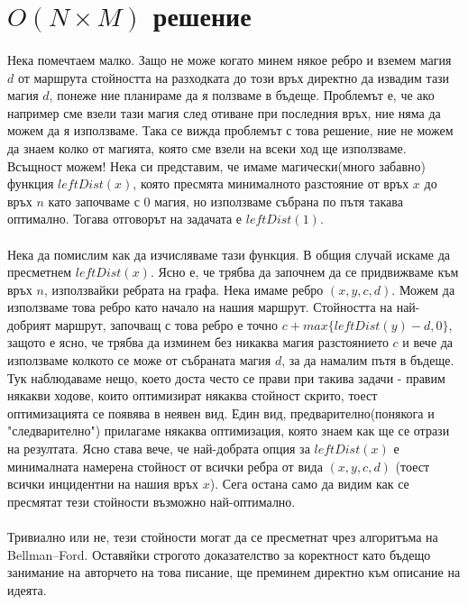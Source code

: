 \documentclass[12pt]{article}
\begin{document}
\section*{$O(N \times M)$ решение}
\paragraph*{}
Нека помечтаем малко. Защо не може когато минем някое ребро и вземем магия $d$ от маршрута стойността на разходката до този връх директно да извадим тази магия $d$, понеже ние планираме да я ползваме в бъдеще. Проблемът е, че ако например сме взели тази магия след отиване при последния връх, ние няма да можем да я използваме. Така се вижда проблемът с това решение, ние не можем да знаем колко от магията, която сме взели на всеки ход ще използваме. Всъщност можем! Нека си представим, че имаме магически(много забавно) функция $leftDist(x)$, която пресмята минималното разстояние от връх $x$ до връх $n$ като започваме с 0 магия, но използваме събрана по пътя такава оптимално. Тогава отговорът на задачата е $leftDist(1)$. 
\paragraph*{}
Нека да помислим как да изчисляваме тази функция. В общия случай искаме да пресметнем $leftDist(x)$. Ясно е, че трябва да започнем да се придвижваме към връх $n$, използвайки ребрата на графа. Нека имаме ребро $(x, y, c, d)$. Можем да използваме това ребро като начало на нашия маршрут. Стойността на най-добрият маршрут, започващ с това ребро е точно $c + max \{ leftDist(y)-d, 0 \}$, защото е ясно, че трябва да изминем без никаква магия разстоянието $c$ и вече да използваме колкото се може от събраната магия $d$, за да намалим пътя в бъдеще. Тук наблюдаваме нещо, което доста често се прави при такива задачи - правим някакви ходове, които оптимизират някаква стойност скрито, тоест оптимизацията се появява в неявен вид. Един вид, предварително(понякога и "следварително") прилагаме някаква оптимизация, която знаем как ще се отрази на резултата. Ясно става вече, че най-добрата опция за $leftDist(x)$ е минималната намерена стойност от всички ребра от вида $(x, y, c, d)$ (тоест всички инцидентни на нашия връх $x$). Сега остана само да видим как се пресмятат тези стойности възможно най-оптимално.
\paragraph*{}
Тривиално или не, тези стойности могат да се пресметнат чрез алгоритъма на Bellman–Ford. Оставяйки строгото доказателство за коректност като бъдещо занимание на авторчето на това писание, ще преминем директно към описание на идеята.
\end{document}

